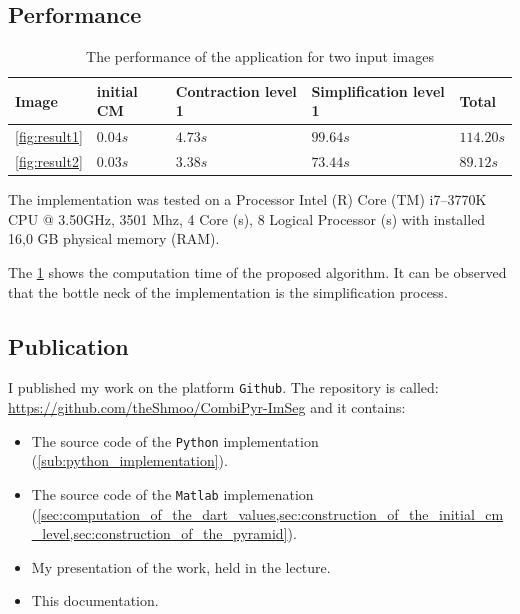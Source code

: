 \documentclass[12pt]{article}
\begin{document}
\subsection{Performance}%
\label{sub:performance}

\begin{table}[tb]
  \caption{The performance of the application for two input images}%
  \label{tab:performance}
  \centering

  \begin{tabular}{lp{}p{}p{}p{}}
  \toprule
  \textbf{Image} & \textbf{initial CM} & \textbf{Contraction level 1} & \textbf{Simplification level 1} & \textbf{Total}\\
  \midrule
    \cref{fig:result1} & \( 0.04s \) & \( 4.73s \) & \( 99.64s \) & \( 114.20s \) \\
    \cref{fig:result2} & \( 0.03s \) & \( 3.38s \) & \( 73.44s \) & \( 89.12s \) \\
  \bottomrule
  \end{tabular}
\end{table}

The implementation was tested on a  Processor Intel (R) Core (TM) i7--3770K CPU @ 3.50GHz, 3501 Mhz, 4 Core (s), 8 Logical Processor (s) with installed 16,0 GB physical memory (RAM).

The \cref{tab:performance} shows the computation time of the proposed algorithm. It can be observed that the bottle neck of the implementation is the simplification process.


\subsection{Publication}%
\label{sub:publication}

I published my work on the platform \texttt{Github}\cite{github}. The repository is called: \url{https://github.com/theShmoo/CombiPyr-ImSeg} and it contains:
\begin{itemize}
  \item The source code of the \texttt{Python} implementation (\cref{sub:python_implementation}).
  \item The source code of the \texttt{Matlab} implemenation (\cref{sec:computation_of_the_dart_values,sec:construction_of_the_initial_cm_level,sec:construction_of_the_pyramid}).
  \item My presentation of the work, held in the lecture.
  \item This documentation.
\end{itemize}
\end{document}
